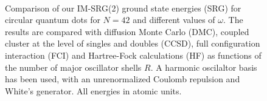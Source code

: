 \documentclass[amsmath, amssymb, aps, floatfix, nofootinbib, preprintnumbers,showpacs, superscriptaddress, twocolumn]{revtex4-1}
\begin{document}
\begin{figure}%
     \begin{center}
         \\ %
         
    \end{center}
    \caption{Comparison of our IM-SRG(2) ground state energies (SRG)
      for circular quantum dots for $N=42$ and different values of
      $\omega$. The results are compared with diffusion Monte
      Carlo (DMC), coupled cluster at the level of singles and doubles
      (CCSD), full configuration interaction (FCI) and Hartree-Fock
      calculations (HF) as functions of the number of major oscillator
      shells $R$. A harmonic oscilaltor basis has been used, with an
      unrenormalized Coulomb repulsion and White's generator. All
      energies in atomic units.}
   \label{fig:N42}
\end{figure}
\end{document}
